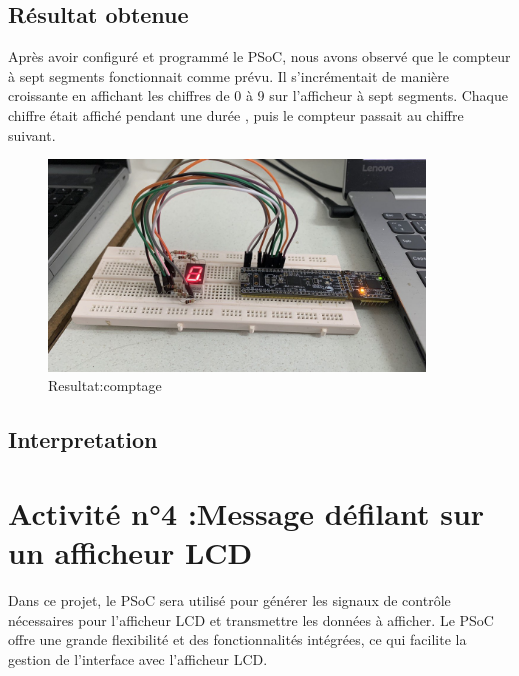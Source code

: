  \subsection{Résultat obtenue}
 \label{sec:Résultat obtenue}
 Après avoir configuré et programmé le PSoC, nous avons observé que le
  compteur à sept segments fonctionnait comme prévu. Il s'incrémentait de
   manière croissante en affichant les chiffres de 0 à 9 sur l'afficheur
    à sept segments. Chaque chiffre était affiché 
 pendant une durée , puis le compteur passait au chiffre suivant. 
 \begin{figure}[htp]
     \centering
     \includegraphics[width=10cm]{images/7seg.jpg }
     \caption{ Resultat:comptage}
     \label{fig:example14}
   \end{figure}
 
  \newpage
 \subsection{Interpretation}
 \label{sec:Interpretation}
 \section{Activité n°4 :Message défilant sur un afficheur LCD }
 \label{chap:Activité n°3 :Message défilant sur un afficheur LCD }
 Dans ce projet, le PSoC sera utilisé pour générer les signaux de contrôle
  nécessaires pour l'afficheur LCD et transmettre les données à afficher. 
  Le PSoC offre une grande flexibilité et des fonctionnalités intégrées,
  ce qui facilite la gestion de l'interface avec l'afficheur LCD.

